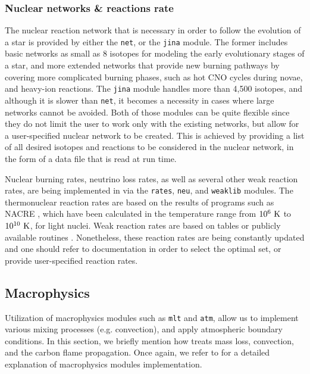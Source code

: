 \documentclass[../../main/thesis_msc.tex]{subfiles}
\begin{document}
				\subsubsection{Nuclear networks \& reactions rate}
					The nuclear reaction network that is necessary in order to follow the evolution of a star is provided by either the \texttt{net}, or the \texttt{jina} module. The former includes basic networks as small as 8 isotopes for modeling the early evolutionary stages of a star, and more extended networks that provide new burning pathways by covering more complicated burning phases, such as hot CNO cycles during novae, and heavy-ion reactions. The \texttt{jina} module handles more than 4,500 isotopes, and although it is slower than \texttt{net}, it becomes a necessity in cases where large networks cannot be avoided. Both of those modules can be quite flexible since they do not limit the user to work only with the existing networks, but allow for a user-specified nuclear network to be created. This is achieved by providing a list of all desired isotopes and reactions to be considered in the nuclear network, in the form of a data file that is read at run time.
					
					Nuclear burning rates, neutrino loss rates, as well as several other weak reaction rates, are being implemented in \mesa via the \texttt{rates}, \texttt{neu}, and \texttt{weaklib} modules. The thermonuclear reaction rates are based on the results of programs such as \textsc{NACRE} \citep[Nuclear Astrophysics Compilation of REaction rates][]{nacre}, which have been calculated in the temperature range from $\rm 10^6 \ K$ to $\rm 10^{10} \ K$, for light nuclei. Weak reaction rates are based on tables or publicly available routines \citep[e.g.][]{itoh1996}. Nonetheless, these reaction rates are being constantly updated and one should refer to \mesa documentation in order to select the optimal set, or provide user-specified reaction rates.
					
					
					
			\subsection{Macrophysics}
				Utilization of macrophysics modules such as \texttt{mlt} and \texttt{atm}, allow us to implement various mixing processes (e.g. convection), and apply atmospheric boundary conditions. In this section, we briefly mention how \mesa treats mass loss, convection, and the carbon flame propagation. Once again, we refer to \cite{Paxton2011} for a detailed explanation of macrophysics modules implementation.
			
\end{document}
